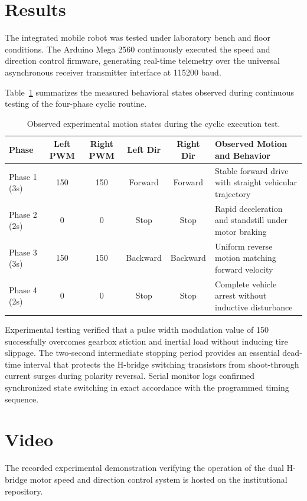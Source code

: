 \documentclass[11pt,a4paper]{article}
\begin{document}
\newpage
\section{Results}
The integrated mobile robot was tested under laboratory bench and floor conditions. The Arduino Mega 2560 continuously executed the speed and direction control firmware, generating real-time telemetry over the universal asynchronous receiver transmitter interface at 115200 baud.

Table~\ref{tab_results} summarizes the measured behavioral states observed during continuous testing of the four-phase cyclic routine.

\begin{table}[H]
\centering
\begin{tabularx}{\textwidth}{@{}lccccX@{}}
\toprule
\textbf{Phase} & \textbf{Left PWM} & \textbf{Right PWM} & \textbf{Left Dir} & \textbf{Right Dir} & \textbf{Observed Motion and Behavior} \\
\midrule
Phase 1 (3s) & 150 & 150 & Forward & Forward & Stable forward drive with straight vehicular trajectory \\
Phase 2 (2s) & 0 & 0 & Stop & Stop & Rapid deceleration and standstill under motor braking \\
Phase 3 (3s) & 150 & 150 & Backward & Backward & Uniform reverse motion matching forward velocity \\
Phase 4 (2s) & 0 & 0 & Stop & Stop & Complete vehicle arrest without inductive disturbance \\
\bottomrule
\end{tabularx}
\caption{Observed experimental motion states during the cyclic execution test.}
\label{tab_results}
\end{table}

Experimental testing verified that a pulse width modulation value of 150 successfully overcomes gearbox stiction and inertial load without inducing tire slippage. The two-second intermediate stopping period provides an essential dead-time interval that protects the H-bridge switching transistors from shoot-through current surges during polarity reversal. Serial monitor logs confirmed synchronized state switching in exact accordance with the programmed timing sequence.

\section{Video}
The recorded experimental demonstration verifying the operation of the dual H-bridge motor speed and direction control system is hosted on the institutional repository.
\end{document}

